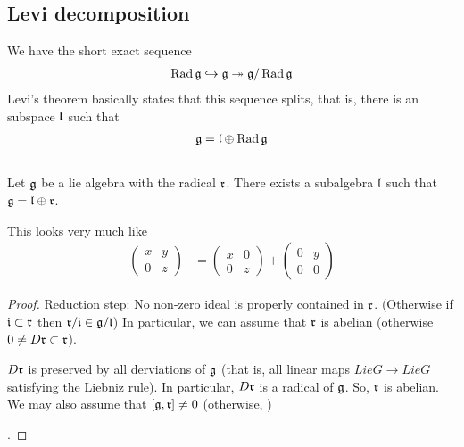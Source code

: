 \subsection{Levi decomposition}
\label{sub:levi_decomposition}

We have the short exact sequence
\begin{align}
    \operatorname{Rad} \mathfrak{g} \hookrightarrow \mathfrak{g} \twoheadrightarrow \mathfrak{g}/\operatorname{Rad}\mathfrak{g}
\end{align}
Levi's theorem basically states that this sequence splits, that is, there is an subspace $\mathfrak{l}$ such that
\begin{align}
    \mathfrak{g} = \mathfrak{l}\oplus\operatorname{Rad}\mathfrak{g}
\end{align}

\hrule\vspace{1em}

\begin{theorem}
   Let $\mathfrak{g}$  be a lie algebra with the radical $\mathfrak{r}$. There exists a subalgebra $\mathfrak{l}$ such that $\mathfrak{g} = \mathfrak{l} \oplus \mathfrak{r}$.
\end{theorem}
\begin{insight}
    This looks very much like 
    \begin{align}
        \begin{pmatrix}  x& y \\ 0 & z \end{pmatrix} &= \begin{pmatrix} x & 0 \\ 0 & z \end{pmatrix} + \begin{pmatrix} 0 & y \\ 0 & 0  \end{pmatrix}
    \end{align} 
\end{insight}
\begin{proof}
    Reduction step: No non-zero ideal is properly contained in $\mathfrak{r}$. (Otherwise if $\mathfrak{i}\subset \mathfrak{r}$ then $\mathfrak{r}/\mathfrak{i} \in \mathfrak{g}/ \mathfrak{l}$) 
     In particular, we can assume that $\mathfrak{r} $ is abelian (otherwise $0\neq D\mathfrak{r}\subset \mathfrak{r}$).

     $D\mathfrak{r}$ is preserved by all derviations of $\mathfrak{g}$ (that is, all linear maps $LieG\to LieG$ satisfying the Liebniz rule). In particular, $D\mathfrak{r}$ is a radical of $\mathfrak{g}$.
     So, $\mathfrak{r}$ is abelian. We may also assume that $[\mathfrak{g}, \mathfrak{r}]\neq 0$ (otherwise, )
    
    .

    
\end{proof}

